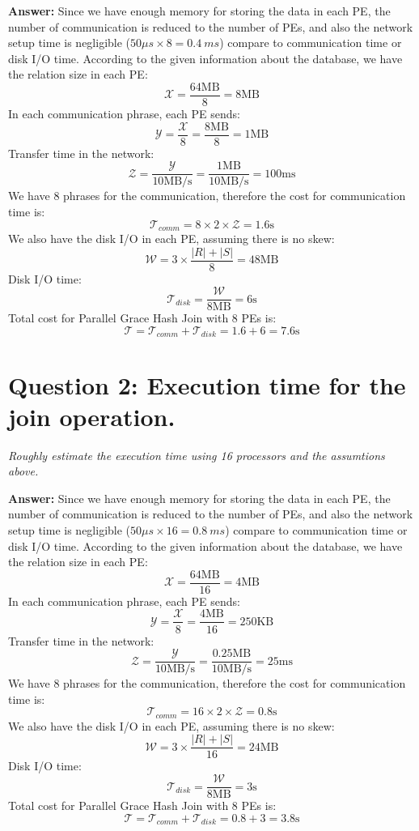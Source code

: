 \documentclass[a4paper,12pt]{article}
\begin{document}
\vspace{1.5em}
\noindent
\textbf{Answer:} 
\noindent
Since we have enough memory for storing the data in each PE, the number of communication is reduced to the number of PEs, and also the network setup time is negligible ($50\mu s \times 8 = 0.4\ ms$) compare to communication time or disk I/O time. According to the given information about the database, we have the relation size in each PE:
$$ \mathcal{X} = \frac{64 \mbox{MB}}{8} = 8 \mbox{MB} $$
In each communication phrase, each PE sends:
$$ \mathcal{Y} = \frac{\mathcal{X}}{8} = \frac{8 \mbox{MB}}{8} = 1 \mbox{MB} $$
Transfer time in the network:
$$ \mathcal{Z} = \frac{\mathcal{Y}}{10 \mbox{MB/s}} = \frac{1 \mbox{MB}}{10 \mbox{MB/s}} = 100 \mbox{ms} $$
We have 8 phrases for the communication, therefore the cost for communication time is:
$$ \mathcal{T}_{comm} = 8 \times 2 \times \mathcal{Z} = 1.6\mbox{s} $$
We also have the disk I/O in each PE, assuming there is no skew:
$$ \mathcal{W} = 3 \times \frac{|R| + |S|}{8} = 48 \mbox{MB} $$
Disk I/O time:
$$ \mathcal{T}_{disk} = \frac{\mathcal{W}}{8 \mbox{MB}} = 6 \mbox{s} $$
Total cost for Parallel Grace Hash Join with 8 PEs is:
$$ \mathcal{T} = \mathcal{T}_{comm} + \mathcal{T}_{disk} = 1.6 + 6 = 7.6 \mbox{s} $$

\section*{Question 2: Execution time for the join operation.}
\setcounter{section}{1}

\textit{Roughly estimate the execution time using 16 processors and the assumtions above.} 

\vspace{1.5em}
\noindent
\textbf{Answer:} 
\noindent
Since we have enough memory for storing the data in each PE, the number of communication is reduced to the number of PEs, and also the network setup time is negligible ($50\mu s \times 16 = 0.8\ ms$) compare to communication time or disk I/O time. According to the given information about the database, we have the relation size in each PE:
$$ \mathcal{X} = \frac{64 \mbox{MB}}{16} = 4 \mbox{MB} $$
In each communication phrase, each PE sends:
$$ \mathcal{Y} = \frac{\mathcal{X}}{8} = \frac{4 \mbox{MB}}{16} = 250 \mbox{KB} $$
Transfer time in the network:
$$ \mathcal{Z} = \frac{\mathcal{Y}}{10 \mbox{MB/s}} = \frac{0.25 \mbox{MB}}{10 \mbox{MB/s}} = 25 \mbox{ms} $$
We have 8 phrases for the communication, therefore the cost for communication time is:
$$ \mathcal{T}_{comm} = 16 \times 2 \times \mathcal{Z} = 0.8\mbox{s} $$
We also have the disk I/O in each PE, assuming there is no skew:
$$ \mathcal{W} = 3 \times \frac{|R| + |S|}{16} = 24 \mbox{MB} $$
Disk I/O time:
$$ \mathcal{T}_{disk} = \frac{\mathcal{W}}{8 \mbox{MB}} = 3 \mbox{s} $$
Total cost for Parallel Grace Hash Join with 8 PEs is:
$$ \mathcal{T} = \mathcal{T}_{comm} + \mathcal{T}_{disk} = 0.8 + 3 = 3.8 \mbox{s} $$
\end{document}
